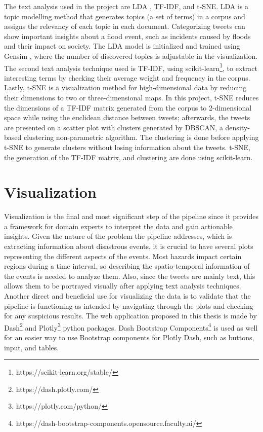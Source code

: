 The text analysis used in the project are \ac{LDA} \cite{pritchardInferencePopulationStructure2000}
\cite{falushInferencePopulationStructure2003}, \ac{TF-IDF}, and
\ac{t-SNE}\cite{vandermaatenVisualizingHighDimensionalData2008}. \ac{LDA} is a topic modelling
method that generates topics (a set of terms) in a corpus and assigns the relevancy of each topic in
each document. Categorizing tweets can show important insights about a flood event, such as
incidents caused by floods and their impact on society. The \ac{LDA} model is initialized and
trained using Gensim \cite{rehurek_lrec}, where the number of discovered topics is adjustable in the
visualization. The second text analysis technique used is \ac{TF-IDF}, using
scikit-learn\footnote{https://scikit-learn.org/stable/}, to extract interesting terms by checking
their average weight and frequency in the corpus. Lastly, \ac{t-SNE} is a visualization method for
high-dimensional data by reducing their dimensions to two or three-dimensional maps. In this
project, \ac{t-SNE} reduces the dimensions of a \ac{TF-IDF} matrix generated from the corpus to
2-dimensional space while using the euclidean distance between tweets; afterwards, the tweets are
presented on a scatter plot with clusters generated by \ac{DBSCAN}, a density-based clustering
non-parametric algorithm. The clustering is done before applying \ac{t-SNE} to generate clusters
without losing information about the tweets. \ac{t-SNE}, the generation of the \ac{TF-IDF} matrix,
and clustering are done using scikit-learn.

\section{Visualization} 
Visualization is the final and most significant step of the pipeline since
it provides a framework for domain experts to interpret the data and gain actionable insights. Given
the nature of the problem the pipeline addresses, which is extracting information about disastrous
events, it is crucial to have several plots representing the different aspects of the events. Most
hazards impact certain regions during a time interval, so describing the spatio-temporal information
of the events is needed to analyze them. Also, since the tweets are mainly text, this allows them to
be portrayed visually after applying text analysis techniques. Another direct and beneficial use for
visualizing the data is to validate that the pipeline is functioning as intended by navigating
through the plots and checking for any suspicious results. The web application proposed in this
thesis is made by Dash\footnote{https://dash.plotly.com/} and
Plotly\footnote{https://plotly.com/python/} python packages. Dash Bootstrap
Components\footnote{https://dash-bootstrap-components.opensource.faculty.ai/} is used as well for an
easier way to use Bootstrap components for Plotly Dash, such as buttons, input, and tables.

